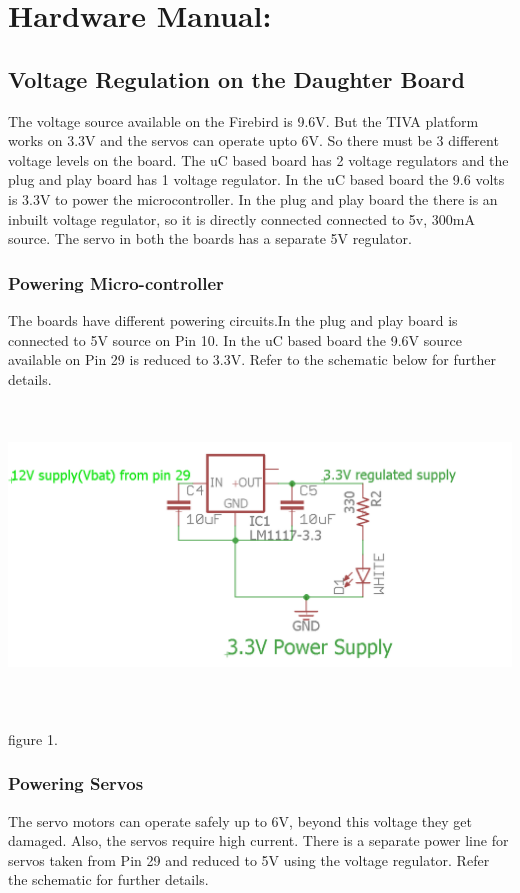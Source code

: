 \documentclass[a4paper,12pt,oneside]{article}
\begin{document}
{	\section{\textbf{Hardware Manual:}}
	\subsection{\textbf{Voltage Regulation on the Daughter Board\\}}
	{The voltage source available on the Firebird is 9.6V. But the TIVA platform works on 3.3V and the servos can operate upto 6V. So there must be 3 different voltage levels on the board. The uC based board has 2 voltage regulators and the plug and play board has 1 voltage regulator. In the uC based board the 9.6 volts is 3.3V to power the microcontroller. In the plug and play board the there is an inbuilt voltage regulator, so it is directly connected connected to 5v, 300mA source. The servo in both the boards has a separate 5V regulator.}
	
	\subsubsection{\textbf{Powering Micro-controller}}
	{The boards have different powering circuits.In the plug and play board is connected to 5V source on Pin 10. In the uC based board the 9.6V source available on Pin 29 is reduced to 3.3V. Refer to the schematic below for further details.\\} 
				
	\includegraphics[width=18cm, height=8cm]{Images/3VPowerSupply}\\\\
	\caption{figure 1.}				
	\subsubsection{\Large \textbf{Powering Servos}}
	{The servo motors can operate safely up to 6V, beyond this voltage they get damaged. Also, the servos require high current. There is a separate power line for servos taken from Pin 29 and reduced to 5V using the voltage regulator. Refer the schematic for further details.\\ }
		
}
\end{document}
